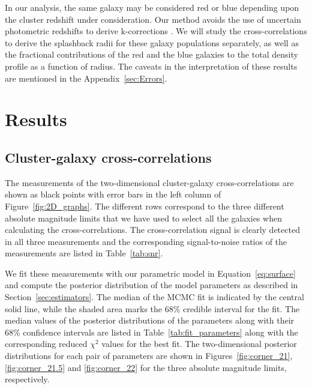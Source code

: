\documentclass[iop, apjl, twocolappendix, numberedappendix]{emulateapj}
\begin{document}
In our analysis, the same galaxy may be considered red or blue depending upon
the cluster redshift under consideration. Our method avoids the use of
uncertain photometric redshifts to derive k-corrections
\citep[cf.][]{baxter2017halo}. We will study the cross-correlations to derive
the splashback radii for these galaxy populations separately, as well as the
fractional contributions of the red and the blue galaxies to the total density
profile as a function of radius. The caveats in the interpretation of these
results are mentioned in the Appendix~\ref{sec:Errors}.

\section{Results}
\label{sec:Results}
\subsection{Cluster-galaxy cross-correlations}
The measurements of the two-dimensional cluster-galaxy
cross-correlations are shown as black points with error bars in the
left column of Figure~\ref{fig:2D_graphs}. The different rows
correspond to the three different absolute magnitude limits that we
have used to select all the galaxies when calculating the
cross-correlations. The cross-correlation signal is clearly detected
in all three measurements and the corresponding signal-to-noise
ratios of the measurements are listed in Table~\ref{tab:snr}.

We fit these measurements with our parametric model in Equation~\ref{eq:surface}
and compute the posterior distribution of the model parameters 
as described in Section~\ref{sec:estimators}. The
median of the MCMC fit is indicated by the central solid line, while
the shaded area marks the 68\% credible interval for the fit. The
median values of the posterior distributions of the parameters along
with their 68\% confidence intervals are listed in
Table~\ref{tab:fit_parameters} along with the corresponding reduced
$\chi^2$ values for the best fit. The two-dimensional posterior
distributions for each pair of parameters are shown in
Figures~\ref{fig:corner_21}, \ref{fig:corner_21.5} and
\ref{fig:corner_22} for the three absolute magnitude limits,
respectively.
\end{document}
